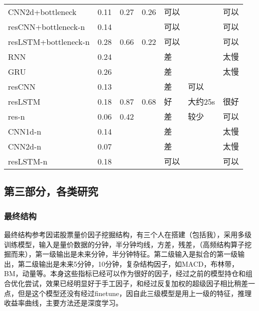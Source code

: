 \documentclass[11pt]{ctexart}
\begin{document}
\begin{table}[h!]
\begin{tabular}{lllllll}
CNN2d+bottleneck            & 0.11       &    0.27                                &    0.26                             & 可以   &  & 可以\\
resCNN+bottleneck-n            & 0.14       &                                    &                                 & 可以   &  & 可以\\
resLSTM+bottleneck-n            & 0.28       & 0.66                                   & 0.22                                & 可以   &  & 可以\\
RNN       & 0.24       &                                    &                                 & 差   &  & 太慢\\
GRU       & 0.26       &                                    &                                 & 差   &  & 太慢\\
resCNN       & 0.13       &                                    &                                 & 差   & 可以\\
resLSTM       & 0.18       &  0.87                                  &  0.68                               & 好   &  大约25s & 很好\\
res-n       & 0.06       &  0.42                                  &                                 & 差   &  较少 & 可以\\
CNN1d-n       & 0.14       &                                    &                                 & 差   &   & 太慢\\
CNN2d-n       & 0.07       &                                    &                                 & 差   &   & 太慢\\
resLSTM-n       & 0.18       &                                    &                                 & 可以   &   & 可以\\
\end{tabular}
\end{table}
\subsection{第三部分，各类研究}
\subsubsection{最终结构}
最终结构参考因诺股票量价因子挖掘结构，有三个人在搭建（包括我），采用多级训练模型，输入是量价数据的分钟，半分钟均线，方差，残差，（高频结构算子挖掘而来），第一级输出是未来分钟，半分钟特征。第二级输入是拟合的第一级输出，第二级输出是未来5分钟，10分钟，复杂结构因子，如MACD，布林带，BM，动量等。本身这些指标已经可以作为很好的因子，经过之前的模型持仓和组合优化尝试，效果已经明显好于手工因子，和经过反复加权的超级因子相比稍差一点，但是这个模型还没有经过finetune，因自此三级模型是用上一级的特征，推理收益率曲线，主要方法还是深度学习。
\end{document}
